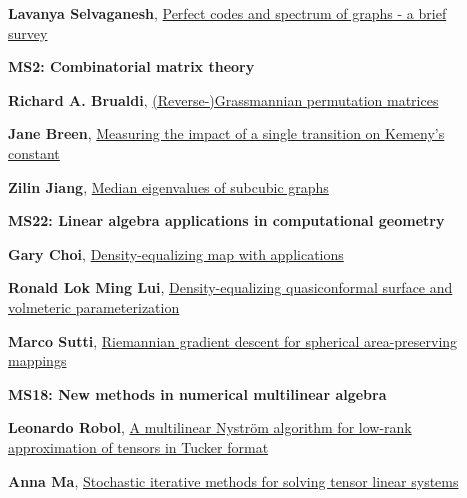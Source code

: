 \documentclass[ILAS2025-program.tex]{subfiles}
\begin{document}
\begin{description}
\begin{description}
        \item[] \hypertarget{up0030}{}\textbf{Lavanya Selvaganesh}, \hyperlink{down0030}{Perfect codes and spectrum of graphs - a brief survey
}
        \end{description}
    \begin{description}
    \item[] {\color{mstitle}\textbf{MS2: Combinatorial matrix theory}} 
    \item[] \hypertarget{up0031}{}\textbf{Richard A. Brualdi}, \hyperlink{down0031}{(Reverse-)Grassmannian permutation matrices}
        \item[] \hypertarget{up0032}{}\textbf{Jane Breen}, \hyperlink{down0032}{Measuring the impact of a single transition on Kemeny's constant
}
        \item[] \hypertarget{up0033}{}\textbf{Zilin Jiang}, \hyperlink{down0033}{Median eigenvalues of subcubic graphs}
        \end{description}
    \begin{description}
    \item[] {\color{mstitle}\textbf{MS22: Linear algebra applications in computational geometry}} 
    \item[] \hypertarget{up0034}{}\textbf{Gary Choi}, \hyperlink{down0034}{Density-equalizing map with applications}
        \item[] \hypertarget{up0035}{}\textbf{Ronald Lok Ming Lui}, \hyperlink{down0035}{Density-equalizing quasiconformal surface and volmeteric parameterization}
        \item[] \hypertarget{up0036}{}\textbf{Marco Sutti}, \hyperlink{down0036}{Riemannian gradient descent for spherical area-preserving mappings
}
        \end{description}
    \begin{description}
    \item[] {\color{mstitle}\textbf{MS18: New methods in numerical multilinear algebra}} 
    \item[] \hypertarget{up0037}{}\textbf{Leonardo Robol}, \hyperlink{down0037}{A multilinear Nyström algorithm for low-rank approximation of tensors in Tucker format}
        \item[] \hypertarget{up0038}{}\textbf{Anna Ma}, \hyperlink{down0038}{Stochastic iterative methods for solving tensor linear systems}

\end{description}
\end{description}
\end{document}

